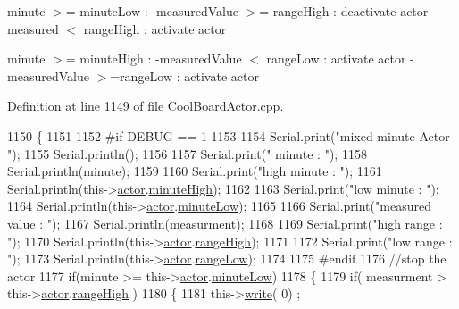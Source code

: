 minute $>$= minute\+Low \+: -\/measured\+Value $>$= range\+High \+: deactivate actor -\/measured $<$ range\+High \+: activate actor

minute $>$= minute\+High \+: -\/measured\+Value $<$ range\+Low \+: activate actor -\/measured\+Value $>$=range\+Low \+: activate actor 

Definition at line 1149 of file Cool\+Board\+Actor.\+cpp.


\begin{DoxyCode}
1150 \{
1151 
1152 \textcolor{preprocessor}{#if DEBUG == 1}
1153     
1154     Serial.print(\textcolor{stringliteral}{"mixed minute Actor "});
1155     Serial.println();
1156 
1157     Serial.print(\textcolor{stringliteral}{" minute : "});
1158     Serial.println(minute);
1159 
1160     Serial.print(\textcolor{stringliteral}{"high minute : "});
1161     Serial.println(this->\hyperlink{class_cool_board_actor_a8f190db9f7a39fddbcef7f152da970e9}{actor}.\hyperlink{struct_cool_board_actor_1_1state_a4bff3d61ead74adb60be224764b93006}{minuteHigh});
1162 
1163     Serial.print(\textcolor{stringliteral}{"low minute : "});
1164     Serial.println(this->\hyperlink{class_cool_board_actor_a8f190db9f7a39fddbcef7f152da970e9}{actor}.\hyperlink{struct_cool_board_actor_1_1state_acbcc2902331fd9d757cd475eb403bdd9}{minuteLow});
1165 
1166     Serial.print(\textcolor{stringliteral}{"measured value : "});
1167     Serial.println(measurment);
1168 
1169     Serial.print(\textcolor{stringliteral}{"high range : "});
1170     Serial.println(this->\hyperlink{class_cool_board_actor_a8f190db9f7a39fddbcef7f152da970e9}{actor}.\hyperlink{struct_cool_board_actor_1_1state_a6e5cd6c5cd44e2decfd8d4df1853f8e3}{rangeHigh});
1171 
1172     Serial.print(\textcolor{stringliteral}{"low range : "});
1173     Serial.println(this->\hyperlink{class_cool_board_actor_a8f190db9f7a39fddbcef7f152da970e9}{actor}.\hyperlink{struct_cool_board_actor_1_1state_a43f891c9fb3bb63575c27cec860de55a}{rangeLow});
1174 
1175 \textcolor{preprocessor}{#endif}
1176     \textcolor{comment}{//stop the actor    }
1177     \textcolor{keywordflow}{if}(minute >= this->\hyperlink{class_cool_board_actor_a8f190db9f7a39fddbcef7f152da970e9}{actor}.\hyperlink{struct_cool_board_actor_1_1state_acbcc2902331fd9d757cd475eb403bdd9}{minuteLow})
1178     \{
1179             \textcolor{keywordflow}{if}( measurment > this->\hyperlink{class_cool_board_actor_a8f190db9f7a39fddbcef7f152da970e9}{actor}.\hyperlink{struct_cool_board_actor_1_1state_a6e5cd6c5cd44e2decfd8d4df1853f8e3}{rangeHigh} )
1180             \{
1181                 this->\hyperlink{class_cool_board_actor_a958786ff01ea1056ee72c72d439f86da}{write}( 0) ;

\end{DoxyCode}
